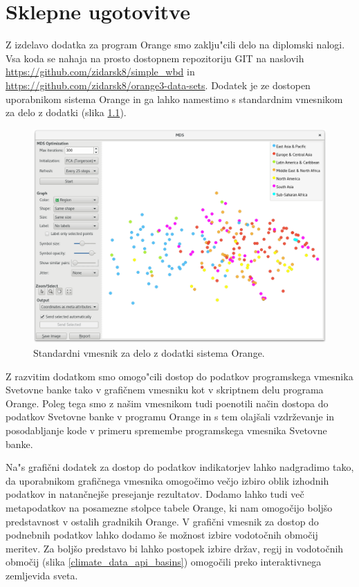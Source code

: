 \chapter{Sklepne ugotovitve}



Z izdelavo dodatka za program Orange smo zaklju"cili delo na diplomski nalogi.
Vsa koda se nahaja na prosto dostopnem repozitoriju GIT na naslovih
\url{https://github.com/zidarsk8/simple_wbd} in
\url{https://github.com/zidarsk8/orange3-data-sets}.
Dodatek je ze dostopen uporabnikom sistema Orange in ga lahko namestimo s
standardnim vmesnikom za delo z dodatki (slika \ref{addon_install}).



\begin{figure}
\begin{center}
\includegraphics[width=12cm]{pic/clustering_mds.png}
\end{center}
\caption{Standardni vmesnik za delo z dodatki sistema Orange.}
\label{addon_install}
\end{figure} 




Z razvitim dodatkom smo omogo"cili dostop do podatkov programskega vmesnika Svetovne 
banke tako v grafičnem vmesniku kot v skriptnem delu programa Orange. Poleg tega
smo z našim vmesnikom tudi poenotili način dostopa do podatkov Svetovne banke
v programu Orange in s tem olajšali vzdrževanje in posodabljanje kode v
primeru spremembe programskega vmesnika Svetovne banke.



Na"s grafični dodatek za dostop do podatkov indikatorjev lahko nadgradimo tako,
da uporabnikom grafičnega vmesnika omogočimo večjo izbiro oblik izhodnih
podatkov in natančnejše presejanje rezultatov. Dodamo lahko tudi več
metapodatkov na posamezne stolpce tabele Orange, ki nam omogočijo boljšo
predstavnost v ostalih gradnikih Orange. V grafični vmesnik za dostop do
podnebnih podatkov lahko dodamo še možnost izbire vodotočnih območij meritev.
Za boljšo predstavo bi lahko postopek izbire držav, regij in vodotočnih
območij (slika \ref{climate_data_api_basins}) omogočili preko interaktivnega 
zemljevida sveta.

% 
% 
